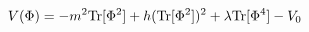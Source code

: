 \begin{equation}
V(\Phi ) = - m^2 {\rm Tr}[ \Phi ^2 ]+ h ( {\rm Tr}[\Phi ^2  ])^2 +
  \lambda {\rm Tr}[\Phi ^4]  - V_0 
\label{quarticV}
\end{equation}

